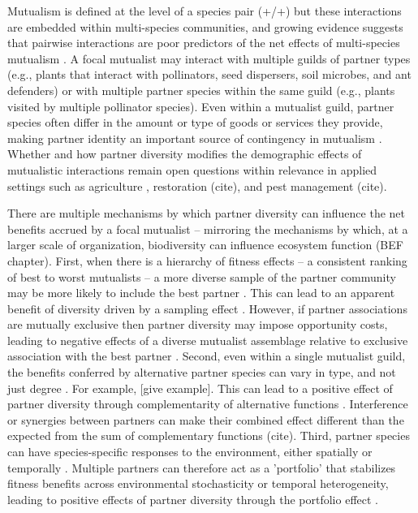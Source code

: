 \documentclass[11pt]{article}
\begin{document}
Mutualism is defined at the level of a species pair (+/+) but these interactions are embedded within multi-species communities, and growing evidence suggests that pairwise interactions are poor predictors of the net effects of multi-species mutualism \citep{Afkhami2014,Palmer2010}. 
A focal mutualist may interact with multiple guilds of partner types (e.g., plants that interact with pollinators, seed dispersers, soil microbes, and ant defenders) or with multiple partner species within the same guild (e.g., plants visited by multiple pollinator species). 
Even within a mutualist guild, partner species often differ in the amount or type of goods or services they provide, making partner identity an important source of contingency in mutualism \citep{Stanton2003}. 
Whether and how partner diversity modifies the demographic effects of mutualistic interactions remain open questions within relevance in applied settings such as agriculture \citep{rogers2014bee}, restoration (cite), and pest management (cite). 

There are multiple mechanisms by which partner diversity can influence the net benefits accrued by a focal mutualist -- mirroring the mechanisms by which, at a larger scale of organization, biodiversity can influence ecosystem function (BEF chapter). 
First, when there is a hierarchy of fitness effects -- a consistent ranking of best to worst mutualists -- a more diverse sample of the partner community may be more likely to include the best partner \cite{Frederickson2013}.
This can lead to an apparent benefit of diversity driven by a sampling effect \cite{Batstone2018}. 
However, if partner associations are mutually exclusive then partner diversity may impose opportunity costs, leading to negative effects of a diverse mutualist assemblage relative to exclusive association with the best partner \citep{Miller2007}. 
Second, even within a single mutualist guild, the benefits conferred by alternative partner species can vary in type, and not just degree \cite{Stachowicz2005,Bronstein2006,Stanton2003}. 
For example, [give example].
This can lead to a positive effect of partner diversity through complementarity of alternative functions \cite{Batstone2018}. 
Interference or synergies between partners can make their combined effect different than the expected from the sum of complementary functions (cite). 
Third, partner species can have species-specific responses to the environment, either spatially \citep{Ollerton2006} or temporally \citep{Alarcon2008}. 
Multiple partners can therefore act as a 'portfolio' that stabilizes fitness benefits across environmental stochasticity or temporal heterogeneity, leading to positive effects of partner diversity through the portfolio effect \cite{Batstone2018,Lazaro2022}. 
\end{document}
